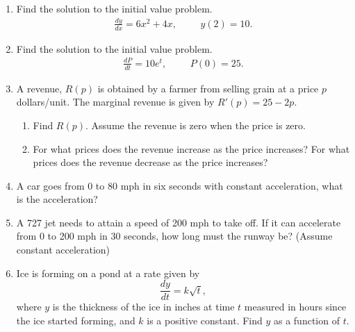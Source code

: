 \documentclass[12pt]{article}
\begin{document}
\drawtitle

\begin{enumerate}

\item Find the solution to the initial value problem.
  \begin{align*}
    \frac{dy}{dx}=6x^2+4x, &&& y(2)=10.
  \end{align*}

  \vfill

\item Find the solution to the initial value problem.
  \begin{align*}
    \frac{dP}{dt}=10e^t, &&& P(0)=25.
  \end{align*}

  \vfill

  \newpage

\item A revenue, $R(p)$ is obtained by a farmer from selling grain at
  a price $p$ dollars/unit. The marginal revenue is given by
  $R'(p)=25-2p$.
  \begin{enumerate}
  \item Find $R(p)$. Assume the revenue is zero when the price is
    zero.

    \vfill
    
  \item For what prices does the revenue increase as the price
    increases? For what prices does the revenue decrease as the price
    increases?

    \vfill
    
  \end{enumerate}

  \newpage

\item A car goes from 0 to 80 mph in six seconds with constant
  acceleration, what is the acceleration?

  \vfill

\item A 727 jet needs to attain a speed of 200 mph to take off. If it
  can accelerate from 0 to 200 mph in 30 seconds, how long must the
  runway be? (Assume constant acceleration)

  \vfill

  \newpage

\item Ice is forming on a pond at a rate given by
  \[
  \frac{dy}{dt}=k\sqrt{t},
  \]
  where $y$ is the thickness of the ice in inches at time $t$ measured
  in hours since the ice started forming, and $k$ is a positive
  constant.  Find $y$ as a function of $t$.


\end{enumerate}
\end{document}
